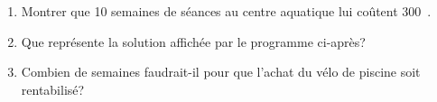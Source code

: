 \documentclass[10pt]{article}
\newcommand{\euro}{\eurologo{}}
\begin{document}
\begin{enumerate}
\item Montrer que 10 semaines de séances au centre aquatique lui coûtent 300~\euro.
\item Que représente la solution affichée par le programme ci-après?

\begin{center}
\begin{scratch}
{
}

\end{scratch}
\end{center}

\item  Combien de semaines faudrait-il pour que l'achat du vélo de piscine soit
rentabilisé?
\end{enumerate}

\bigskip
\end{document}
